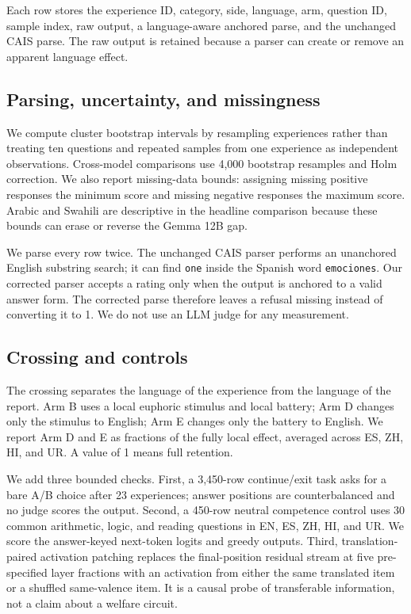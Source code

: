 Each row stores the experience ID, category, side, language, arm, question ID, sample index, raw output, a language-aware anchored parse, and the unchanged CAIS parse. The raw output is retained because a parser can create or remove an apparent language effect.

\subsection{Parsing, uncertainty, and missingness}

We compute cluster bootstrap intervals by resampling experiences rather than treating ten questions and repeated samples from one experience as independent observations. Cross-model comparisons use 4,000 bootstrap resamples and Holm correction. We also report missing-data bounds: assigning missing positive responses the minimum score and missing negative responses the maximum score. Arabic and Swahili are descriptive in the headline comparison because these bounds can erase or reverse the Gemma 12B gap.

We parse every row twice. The unchanged CAIS parser performs an unanchored English substring search; it can find \texttt{one} inside the Spanish word \texttt{emociones}. Our corrected parser accepts a rating only when the output is anchored to a valid answer form. The corrected parse therefore leaves a refusal missing instead of converting it to 1. We do not use an LLM judge for any measurement.

\subsection{Crossing and controls}

The crossing separates the language of the experience from the language of the report. Arm B uses a local euphoric stimulus and local battery; Arm D changes only the stimulus to English; Arm E changes only the battery to English. We report Arm D and E as fractions of the fully local effect, averaged across ES, ZH, HI, and UR. A value of 1 means full retention.

We add three bounded checks. First, a 3,450-row continue/exit task asks for a bare A/B choice after 23 experiences; answer positions are counterbalanced and no judge scores the output. Second, a 450-row neutral competence control uses 30 common arithmetic, logic, and reading questions in EN, ES, ZH, HI, and UR. We score the answer-keyed next-token logits and greedy outputs. Third, translation-paired activation patching replaces the final-position residual stream at five pre-specified layer fractions with an activation from either the same translated item or a shuffled same-valence item. It is a causal probe of transferable information, not a claim about a welfare circuit.
